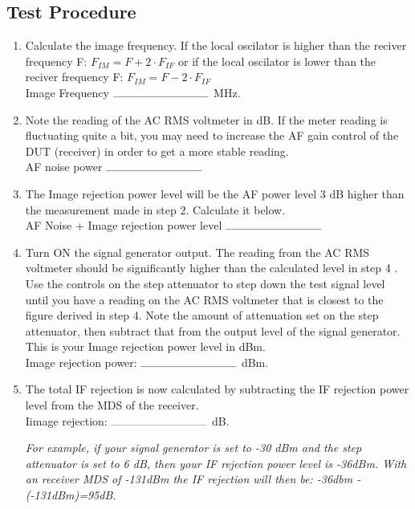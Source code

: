 \documentclass[10pt,letterpaper]{book}
\begin{document}
\subsection*{Test Procedure}
\begin{enumerate}
	\item Calculate the image frequency. If the local oscilator is higher than the reciver frequency F: $  F_{IM} = F + 2 \cdot F_{IF}$ or if the local oscilator is lower than the reciver frequency F: $  F_{IM} = F - 2 \cdot F_{IF}$
	\vspace{30pt}
	\\Image Frequency $\rule{3cm}{0.1mm}$ MHz.

	\item Note the reading of the AC RMS voltmeter in dB. If the meter reading is fluctuating quite a bit, you may need to increase the AF gain control of the DUT (receiver) in order to get a more stable reading.
	\vspace{30pt}
	\\AF noise power $\rule{3cm}{0.1mm}$ 

	\item  The Image rejection power level will be the AF power level 3 dB higher than the measurement made in step 2. Calculate it below.
	\vspace{30pt}
	\\AF Noise + Image rejection power level $\rule{3cm}{0.1mm}$ 

	\item Turn ON the signal generator output. The reading from the AC RMS voltmeter should be significantly higher than the calculated level in step 4 . Use the controls on the step attenuator to step down the test signal level until you have a reading on the AC RMS voltmeter that is closest to the figure derived in step 4. Note the amount of attenuation set on the step attenuator, then subtract that from the output level of the signal generator. This is your Image rejection power level in dBm.
	\vspace{30pt}
	\\Image rejection power: $\rule{3cm}{0.1mm}$ dBm.
	 
	\item  The total IF rejection is now calculated by subtracting the IF rejection power level from the MDS of the receiver.
	\vspace{30pt}
	 \\Iimage rejection: $\rule{3cm}{0.1mm}$ dB.

	\emph{For example, if your signal generator is set to -30 dBm and the step attenuator is set to 6 dB, then your IF rejection power level is -36dBm. With an receiver MDS of -131dBm the IF rejection will then be: -36dbm -(-131dBm)=95dB.} 
\end{enumerate}
\end{document}
